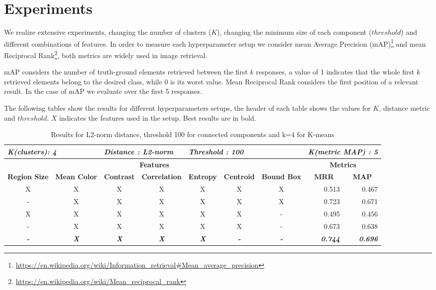 \section{Experiments}
\label{sec:experiments}

We realize extensive experiments, changing the number of clusters ($K$), changing the minimum size of each component ($threshold$) and different combinations of features. In order to measure each hyperparameter setup we consider mean Average Precision (mAP)\footnote{\url{https://en.wikipedia.org/wiki/Information_retrieval\#Mean_average_precision}} and mean Reciprocal Rank\footnote{\url{https://en.wikipedia.org/wiki/Mean_reciprocal_rank}}, both metrics are widely used in image retrieval. 

mAP considers the number of truth-ground elements retrieved between the first $k$ responses, a value of 1 indicates that the whole first $k$ retrieved elements belong to the desired class, while 0 is its worst value. Mean Reciprocal Rank considers the first position of a relevant result. In the case of mAP we evaluate over the first 5 responses.

The following tables show the results for different hyperparameters setups, the header of each table shows the values for $K$, distance metric and $threshold$. $X$ indicates the features used in the setup. Best results are in bold.

\begin{table}[H]
\centering

\begin{tabular}{|c|c|c|c|c|c|c|r|r|}
\hline
\multicolumn{2}{|l|}{\textit{\textbf{K(clusters): 4}}} & \multicolumn{2}{l|}{\textit{\textbf{Distance : L2-norm}}} & \multicolumn{3}{l|}{\textit{\textbf{Threshold : 100}}} & \multicolumn{2}{l|}{\textit{\textbf{K(metric MAP) :  5}}} \\ \hline
\multicolumn{7}{|c|}{\textbf{Features}} & \multicolumn{2}{c|}{\textbf{Metrics}} \\ \hline
\textbf{Region Size} & \textbf{Mean Color} & \textbf{Contrast} & \textbf{Correlation} & \textbf{Entropy} & \textbf{Centroid} & \textbf{Bound Box} & \multicolumn{1}{c|}{\textbf{MRR}} & \multicolumn{1}{c|}{\textbf{MAP}} \\ \hline
X & X & X & X & X & X & X & 0.513 & 0.467 \\ \hline
- & X & X & X & X & X & X & 0.723 & 0.671 \\ \hline
X & X & X & X & X & X & - & 0.495 & 0.456 \\ \hline
- & X & X & X & X & X & - & 0.673 & 0.638 \\ \hline
\textit{\textbf{-}} & \textit{\textbf{X}} & \textit{\textbf{X}} & \textit{\textbf{X}} & \textit{\textbf{X}} & \textit{\textbf{-}} & \textit{\textbf{-}} & \textit{\textbf{0.744}} & \textit{\textbf{0.696}} \\ \hline
\end{tabular}


\caption{Results for L2-norm distance, threshold 100 for connected components and k=4 for K-means}
\label{table:results01}
\end{table}


